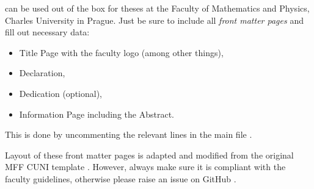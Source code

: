 \begin{remark}
    \TeXtured{} can be used out of the box for theses at the Faculty of Mathematics and Physics, Charles University in Prague.
    Just be sure to include all \emph{front matter pages} and fill out necessary data:
    \begin{itemize}
        \item \textsf{Title Page} with the faculty logo (among other things),
        \item \textsf{Declaration},
        \item \textsf{Dedication} (optional),
        \item \textsf{Information Page} including the \textsf{Abstract}.
    \end{itemize}
    This is done by uncommenting the relevant lines in the main file .

    Layout of these front matter pages is adapted and modified from the original MFF CUNI template \autocite{MaresTemplate}.
    However, always make sure it is compliant with the faculty guidelines, otherwise please raise an issue on GitHub \autocite{TeXtured}.
\end{remark}
